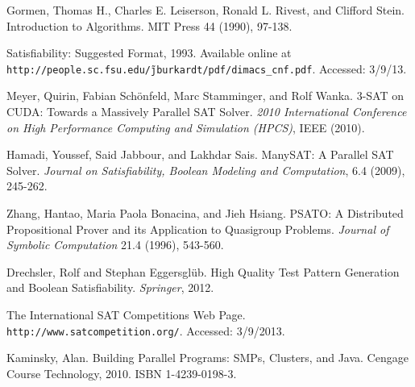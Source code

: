 \documentclass[paper=a4, fontsize=11pt]{scrartcl} %
\begin{document}

\begin{thebibliography}{9}

 Gormen, Thomas H., Charles E. Leiserson, Ronald L. Rivest, and Clifford Stein. Introduction to Algorithms. MIT Press 44 (1990), 97-138.

 Satisfiability: Suggested Format, 1993. Available online at \\
{\tt http://people.sc.fsu.edu/\~jburkardt/pdf/dimacs\_cnf.pdf}. Accessed: 3/9/13.

 Meyer, Quirin, Fabian Sch\"{o}nfeld, Marc Stamminger, and Rolf Wanka. 3-SAT on CUDA: Towards a Massively Parallel SAT Solver. \emph{2010 International Conference on High Performance Computing and Simulation (HPCS)}, IEEE (2010).

 Hamadi, Youssef, Said Jabbour, and Lakhdar Sais. ManySAT: A Parallel SAT Solver. \emph{Journal on Satisfiability, Boolean Modeling and Computation}, 6.4 (2009), 245-262.

 Zhang, Hantao, Maria Paola Bonacina, and Jieh Hsiang. PSATO: A Distributed Propositional Prover and its Application to Quasigroup Problems. \emph{Journal of Symbolic Computation} 21.4 (1996), 543-560.

 Drechsler, Rolf and Stephan Eggersgl\"{u}b. High Quality Test Pattern Generation and Boolean Satisfiability. \emph{Springer}, 2012.

 The International SAT Competitions Web Page. {\tt http://www.satcompetition.org/}. Accessed: 3/9/2013.

 Kaminsky, Alan. Building Parallel Programs: SMPs, Clusters, and Java. Cengage Course Technology, 2010. ISBN 1-4239-0198-3.

\end{thebibliography}
\end{document}
